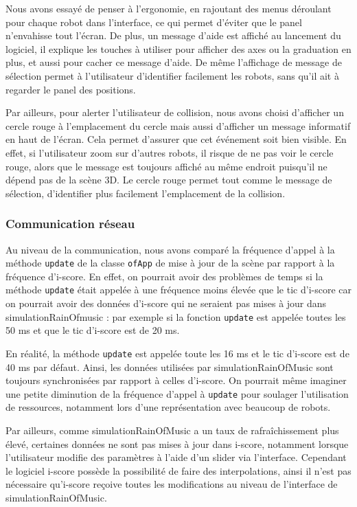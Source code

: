 Nous avons essayé de penser à l'ergonomie, en rajoutant des menus déroulant pour chaque robot dans l'interface, ce qui permet d'éviter que le panel n'envahisse tout l'écran. De plus, un message d'aide est affiché au lancement du logiciel, il explique les touches à utiliser pour afficher des axes ou la graduation en plus, et aussi pour cacher ce message d'aide.
De même l'affichage de message de sélection permet à l'utilisateur d'identifier facilement les robots, sans qu'il ait à regarder le panel des positions.

Par ailleurs, pour alerter l'utilisateur de collision, nous avons choisi d'afficher un cercle rouge à l'emplacement du cercle mais aussi d'afficher un message informatif en haut de l'écran. Cela permet d'assurer que cet événement soit bien visible. En effet, si l'utilisateur zoom sur d'autres robots, il risque de ne pas voir le cercle rouge, alors que le message est toujours affiché au même endroit puisqu'il ne dépend pas de la scène 3D. Le cercle rouge permet tout comme le message de sélection, d'identifier plus facilement l'emplacement de la collision.

\subsubsection{Communication réseau}

Au niveau de la communication, nous avons comparé la fréquence d'appel à la méthode \verb|update| de la classe \verb|ofApp| de mise à jour de la scène par rapport à la fréquence d'i-score. En effet, on pourrait avoir des problèmes de temps si la méthode \verb|update| était appelée à une fréquence moins élevée que le tic d'i-score car on pourrait avoir des données d'i-score qui ne seraient pas mises à jour dans simulationRainOfmusic : par exemple si la fonction \verb|update| est appelée toutes les 50 ms et que le tic d'i-score est de 20 ms. 

En réalité, la méthode \verb|update| est appelée toute les 16 ms et le tic d'i-score est de 40 ms par défaut. Ainsi, les données utilisées par simulationRainOfMusic sont toujours synchronisées par rapport à celles d'i-score. On pourrait même imaginer une petite diminution de la fréquence d'appel à \verb|update| pour soulager l'utilisation de ressources, notamment lors d'une représentation avec beaucoup de robots. 

Par ailleurs, comme simulationRainOfMusic a un taux de rafraîchissement plus élevé, certaines données ne sont pas mises à jour dans i-score, notamment lorsque l'utilisateur modifie des paramètres à l'aide d'un slider via l'interface. Cependant le logiciel i-score possède la possibilité de faire des interpolations, ainsi il n'est pas nécessaire qu'i-score reçoive toutes les modifications au niveau de l'interface de simulationRainOfMusic. 

